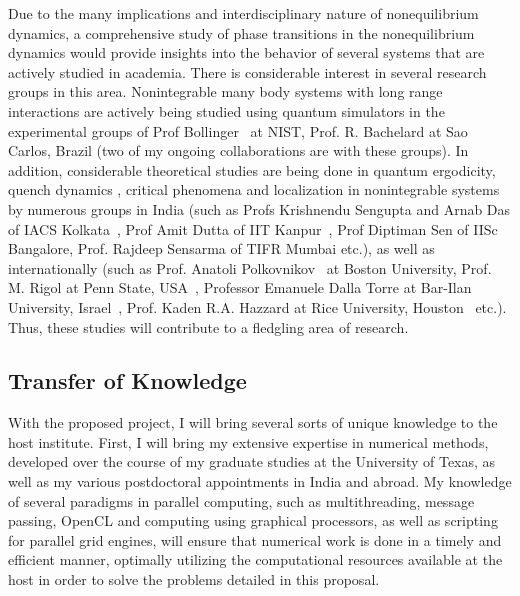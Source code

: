 \documentclass[a4paper,11pt,color]{article}
\begin{document}
Due to the many implications and interdisciplinary nature of nonequilibrium dynamics, a comprehensive study of phase transitions in the nonequilibrium dynamics  would provide insights into the behavior of several systems that are actively studied in academia. There is considerable interest in several research groups in this area. Nonintegrable many body systems with long range interactions are actively being studied using quantum simulators in the experimental groups of Prof Bollinger~\cite{bollinger} at NIST, Prof. R. Bachelard at Sao Carlos, Brazil (two of my ongoing collaborations are with these groups). In addition, considerable theoretical studies are being done 
in quantum ergodicity, quench dynamics , critical phenomena and localization in nonintegrable systems by numerous groups in India (such as Profs Krishnendu Sengupta and Arnab Das of IACS Kolkata~\cite{krishrev,freezing}, Prof Amit Dutta of IIT Kanpur~\cite{kitaev}, Prof Diptiman Sen of IISc Bangalore, Prof. Rajdeep Sensarma of TIFR Mumbai etc.), as well as internationally (such as Prof. Anatoli Polkovnikov~\cite{kitaev} at Boston University, Prof. M. Rigol at Penn State, USA~\cite{thermalization}, Professor  Emanuele Dalla Torre at Bar-Ilan University, Israel~\cite{michael}, Prof. Kaden R.A. Hazzard at Rice University, Houston~\cite{michael} etc.). Thus, these studies will contribute to a fledgling area of research. 

\subsection{ Transfer of Knowledge}
With the proposed project, I will bring several sorts of unique knowledge to the host institute. First, I will bring my extensive expertise in numerical methods, developed over the course of my graduate studies at the University of Texas, as well as my various postdoctoral appointments in India and abroad.  My knowledge of several paradigms in parallel computing, such as multithreading, message passing, OpenCL and computing using graphical processors, as well as scripting for parallel grid engines, will ensure that numerical work is done in a timely and efficient manner, optimally utilizing the computational resources available at the host in order to solve the problems detailed in this proposal.
\end{document}
